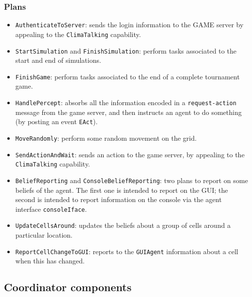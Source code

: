 \documentclass[10pt]{article}
\begin{document}
\subsubsection*{Plans}
\begin{itemize}
\item \texttt{AuthenticateToServer}: sends the login information to the GAME server by appealing to the \texttt{ClimaTalking} capability.

\item \texttt{StartSimulation} and \texttt{FinishSimulation}: perform tasks associated to the start and end of simulations.

\item \texttt{FinishGame}: perform tasks associated to the end of a complete tournament game.

\item \texttt{HandlePercept}: absorbs all the information encoded in a \texttt{request-action} message from the game server, and then instructs an agent to do something (by posting an event \texttt{EAct}).

\item \texttt{MoveRandomly}: perform some random movement on the grid.

\item \texttt{SendActionAndWait}: sends an action to the game server, by appealing to the \texttt{ClimaTalking} capability.

\item \texttt{BeliefReporting} and \texttt{ConsoleBeliefReporting}: two plans to report on some beliefs of the agent. The first one is intended to report on the GUI; the second is intended to report information on the console
via the agent interface \texttt{consoleIface}.


\item \texttt{UpdateCellsAround}: updates the beliefs about a group of cells around a particular location.

\item \texttt{ReportCellChangeToGUI}: reports to the \texttt{GUIAgent} information about a cell when this has changed.

\end{itemize}






\subsection{Coordinator components}
\end{document}
